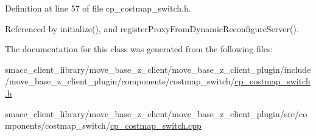 Definition at line 57 of file cp\+\_\+costmap\+\_\+switch.\+h.



Referenced by initialize(), and register\+Proxy\+From\+Dynamic\+Reconfigure\+Server().



The documentation for this class was generated from the following files\+:\begin{DoxyCompactItemize}
\item 
smacc\+\_\+client\+\_\+library/move\+\_\+base\+\_\+z\+\_\+client/move\+\_\+base\+\_\+z\+\_\+client\+\_\+plugin/include/move\+\_\+base\+\_\+z\+\_\+client\+\_\+plugin/components/costmap\+\_\+switch/\hyperlink{cp__costmap__switch_8h}{cp\+\_\+costmap\+\_\+switch.\+h}\item 
smacc\+\_\+client\+\_\+library/move\+\_\+base\+\_\+z\+\_\+client/move\+\_\+base\+\_\+z\+\_\+client\+\_\+plugin/src/components/costmap\+\_\+switch/\hyperlink{cp__costmap__switch_8cpp}{cp\+\_\+costmap\+\_\+switch.\+cpp}\end{DoxyCompactItemize}
